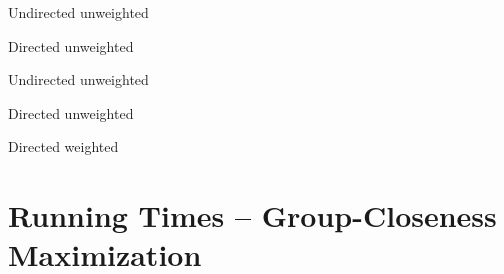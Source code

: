 \begin{table}[H]
\scriptsize
{}
\label{tab:gh-gc-apx:time-gh-cplx}

\begin{subtable}[t]{.6\textwidth}
\centering
\caption{Undirected unweighted}

\end{subtable}\hfill
\begin{subtable}[t]{.4\textwidth}
\centering
\caption{Directed unweighted}

\end{subtable}
\end{table}

\begin{table}[H]
\scriptsize
{}
\label{tab:gh-gc-apx:time-gh-high-diam}

\begin{subtable}[t]{.5\textwidth}
\centering
\caption{Undirected unweighted}

\end{subtable}\hfill
\begin{subtable}[t]{.5\textwidth}
\centering
{}

\end{subtable}\medskip

\begin{subtable}[t]{.485\textwidth}
\centering
\caption{Directed unweighted}

\end{subtable}\hfill
\begin{subtable}[t]{.515\textwidth}
\centering
\caption{Directed weighted}

\end{subtable}
\end{table}

\section{Running Times -- Group-Closeness Maximization}
\label{sec:gh-gc:running-times-gc}


